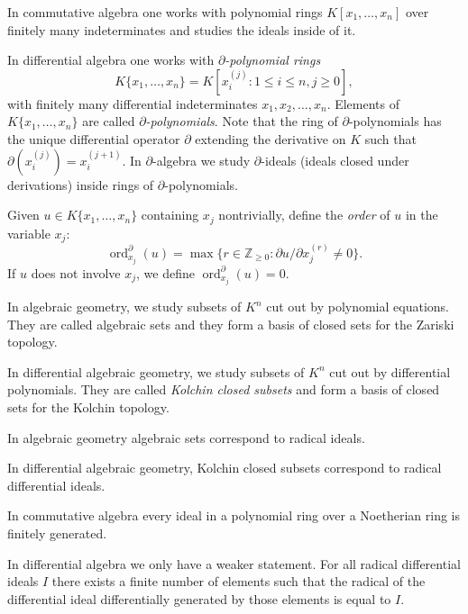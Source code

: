 \documentclass[12pt]{book}
\numberwithin{equation}{section}
\theoremstyle{definition}
\theoremstyle{remark}
\newcommand{\ZZ}{\mathbb{Z}}
\newcommand{\ord}{\operatorname{ord}}
\begin{document}
\begin{description}[leftmargin=*]
\item[Polynomials] In commutative algebra one works with polynomial rings  $K[x_1,\ldots,x_n]$ over finitely many indeterminates and studies the ideals inside of it.

In differential algebra one works with \emph{$\partial$-polynomial rings}
$$K\lbrace x_1,\ldots,x_n\rbrace = K[ x_i^{(j)} \colon 1\leq i \leq n, j\geq 0],$$ 
with finitely many differential indeterminates $x_1,x_2,\ldots,x_n$.
Elements of $K\lbrace x_1,\ldots,x_n\rbrace$ are called \emph{$\partial$-polynomials}. 
Note that the ring of $\partial$-polynomials has the unique differential operator $\partial$ extending the derivative on $K$ such that $\partial(x_i^{(j)}) = x_i^{(j+1)}$.
In $\partial$-algebra we study $\partial$-ideals (ideals closed under derivations) inside rings of $\partial$-polynomials.

Given $u \in K\lbrace x_1,\ldots,x_n\rbrace$ containing $x_j$ nontrivially, define the \emph{order} of $u$ in the variable $x_j$:
$$\ord^{\partial}_{x_j}(u) = \max\lbrace r \in \ZZ_{\geq 0} \colon \partial u/\partial x_j^{(r)} \neq 0 \rbrace.$$
If $u$ does not involve $x_j$, we define $\ord^{\partial}_{x_j}(u)=0$.

\item[Varieties] In algebraic geometry, we study subsets of $K^n$ cut out by polynomial equations. 
They are called algebraic sets and they form a basis of closed sets for the Zariski topology.

In differential algebraic geometry, we study subsets of $K^n$ cut out by differential polynomials. They are called \emph{Kolchin closed subsets} and form a basis of closed sets for the Kolchin topology.

\item[Nullstellensatz]
In algebraic geometry algebraic sets correspond to radical ideals. 

In differential algebraic geometry, Kolchin closed subsets correspond to radical differential ideals.

\item[Basis Theorems] In commutative algebra every ideal in a polynomial ring over a Noetherian ring is finitely generated. 

In differential algebra we only have a weaker statement. 
For all radical differential ideals $I$ there exists a finite number of elements such that the radical of the differential ideal differentially generated by those elements is equal to $I$.


\end{description}
\end{document}
